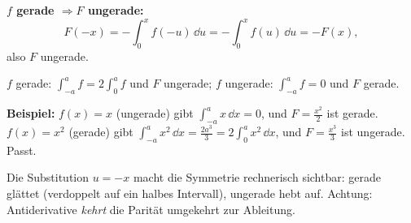 \textbf{$f$ gerade $\Rightarrow F$ ungerade:}
\begin{equation}
  F(-x)=-\int_0^x f(-u)\,\dd u
  = -\int_0^x f(u)\,\dd u = -F(x),
\end{equation}
also $F$ ungerade.

\begin{ergebnis}
$f$ gerade: $\displaystyle\int_{-a}^a f=2\int_0^a f$ und $F$ ungerade;
\qquad
$f$ ungerade: $\displaystyle\int_{-a}^a f=0$ und $F$ gerade.
\end{ergebnis}

\begin{kontrolle}
\textbf{Beispiel:} $f(x)=x$ (ungerade) gibt $\int_{-a}^a x\,\dd x=0$, und
$F=\frac{x^2}{2}$ ist gerade. $f(x)=x^2$ (gerade) gibt
$\int_{-a}^a x^2\,\dd x=\frac{2a^3}{3}=2\int_0^a x^2\,\dd x$, und
$F=\frac{x^3}{3}$ ist ungerade. Passt.
\end{kontrolle}

\begin{merksatz}
Die Substitution $u=-x$ macht die Symmetrie rechnerisch sichtbar: gerade
glättet (verdoppelt auf ein halbes Intervall), ungerade hebt auf. Achtung:
Antiderivative \emph{kehrt} die Parität umgekehrt zur Ableitung.
\end{merksatz}
